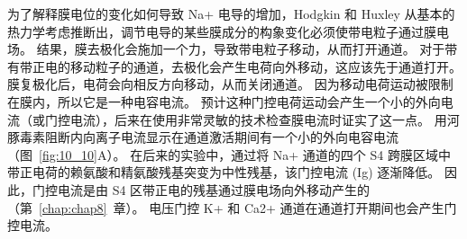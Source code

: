 为了解释膜电位的变化如何导致 Na+ 电导的增加，Hodgkin 和 Huxley 从基本的热力学考虑推断出，调节电导的某些膜成分的构象变化必须使带电粒子通过膜电场。 
结果，膜去极化会施加一个力，导致带电粒子移动，从而打开通道。
对于带有带正电的移动粒子的通道，去极化会产生电荷向外移动，这应该先于通道打开。
膜复极化后，电荷会向相反方向移动，从而关闭通道。 
因为移动电荷运动被限制在膜内，所以它是一种电容电流。
预计这种门控电荷运动会产生一个小的外向电流（或门控电流），后来在使用非常灵敏的技术检查膜电流时证实了这一点。
用河豚毒素阻断内向离子电流显示在通道激活期间有一个小的外向电容电流（图~\ref{fig:10_10}A）。 
在后来的实验中，通过将 Na+ 通道的四个 S4 跨膜区域中带正电荷的赖氨酸和精氨酸残基突变为中性残基，该门控电流 (Ig) 逐渐降低。 
因此，门控电流是由 S4 区带正电的残基通过膜电场向外移动产生的（第~\ref{chap:chap8}~章）。 
电压门控 K+ 和 Ca2+ 通道在通道打开期间也会产生门控电流。


